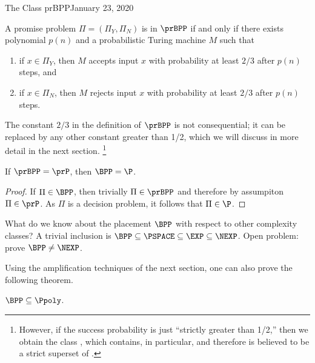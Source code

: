 \begin{lecture}{1}{The Class prBPP}{January 23, 2020}
\begin{definition}[$\prBPP$]
  A promise problem $\Pi = (\Pi_Y, \Pi_N)$ is in $\prBPP$ if and only if there
  exists polynomial $p(n)$ and a probabilistic Turing machine $M$ such that
  \begin{enumerate}
    \item if $x \in \Pi_Y$, then $M$ accepts input $x$ with probability at
      least $2/3$ after $p(n)$ steps, and
    \item if $x \in \Pi_N$, then $M$ rejects input $x$ with probability at
      least $2/3$ after $p(n)$ steps.
  \end{enumerate}
\end{definition}

The constant $2/3$ in the definition of $\prBPP$ is not consequential; it
can be replaced by any other constant greater than 1/2, which we will discuss
in more detail in the next section.%
\footnote{However, if the success probability is just ``strictly greater than
  1/2,'' then we obtain the class \PP, which contains, in particular, \NP and
  therefore is believed to be a strict superset of \BPP.}

\begin{proposition}
  If $\prBPP = \prP$, then $\BPP = \P$.
\end{proposition}

\begin{proof}
  If $\Pi \in \BPP$, then trivially $\Pi \in \prBPP$ and therefore by
  assumpiton $\Pi \in \prP$. As $\Pi$ is a decision problem, it follows
  that $\Pi \in \P$.
\end{proof}

What do we know about the placement $\BPP$ with respect to other complexity
classes? A trivial inclusion is $\BPP \subseteq \PSPACE \subseteq \EXP
\subseteq \NEXP$. Open problem: prove $\BPP \ne \NEXP$.

Using the amplification techniques of the next section, one can also prove
the following theorem.

\begin{theorem}
  $\BPP \subseteq \Ppoly$.
\end{theorem}



\end{lecture}
